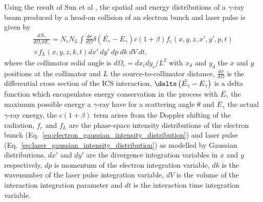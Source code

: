 \documentclass[../main.tex]{subfiles}
\begin{document}
Using the result of Sun et al \cite{sun2009characterizations,sun2011theoretical}, the spatial and energy distributions of a $\gamma$-ray beam produced by a head-on collision of an electron bunch and laser pulse is given by
\begin{multline}
\frac{dN_{\gamma}}{d\Omega_{c} dE_{\gamma}} = N_{e}N_{L}\int \frac{d\sigma}{d\Omega}\delta\left(\bar{E_{\gamma}}-E_{\gamma}\right)c\left(1+\beta\right)f_{e}\left(x,y,z,x',y',p,t\right)\\ \times f_L\left(x,y,z,k,t\right)dx'~dy'~dp~dk~dV~dt,
\label{eq:central_distribution_sun}
\end{multline}
where the collimator solid angle is $d\Omega_{c} = dx_{c}dy_{c}/L^{2}$ with $x_{d}$ and $y_{d}$ the $x$ and $y$ positions at the collimator and $L$ the source-to-collimator distance, $\frac{d\sigma}{d\Omega}$ is the differential cross section of the ICS interaction, $\delts\left(\bar{E_{\gamma}}-E_{\gamma}\right)$ is a delta function which encapsulates energy conservation in the process with $\bar{E_{\gamma}}$ the maximum possible energy a $\gamma$-ray have for a scattering angle $\theta$ and $E_{\gamma}$ the actual $\gamma$-ray energy, the $c\left(1+\beta\right)$ term arises from the Doppler shifting of the radiation, $f_{e}$ and $f_{L}$ are the phase-space intensity distributions of the electron bunch (Eq.~\ref{eq:electron_gaussian_intensity_distribution}) and laser pulse (Eq.~\ref{eq:laser_gaussian_intensity_distribution}) as modelled by Gaussian distributions, $dx'$ and $dy'$ are the divergence integration variables in $x$ and $y$ respectively, $dp$ is momentum of the electron integration variable, $dk$ is the wavenumber of the laser pulse integration variable, $dV$ is the volume of the interaction integration parameter and  $dt$ is the interaction time integration variable. 
\end{document}

